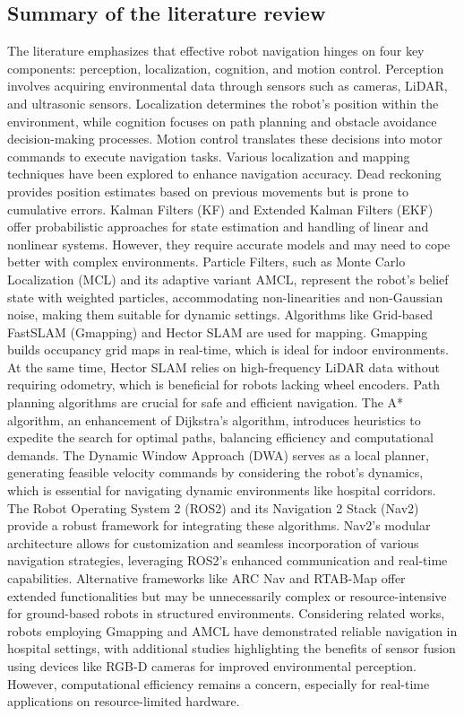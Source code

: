 \subsection{Summary of the literature review}
The literature emphasizes that effective robot navigation hinges on four key components: perception, localization, cognition, and motion control. Perception involves acquiring environmental data through sensors such as cameras, LiDAR, and ultrasonic sensors. Localization determines the robot's position within the environment, while cognition focuses on path planning and obstacle avoidance decision-making processes. Motion control translates these decisions into motor commands to execute navigation tasks.
Various localization and mapping techniques have been explored to enhance navigation accuracy. Dead reckoning provides position estimates based on previous movements but is prone to cumulative errors. Kalman Filters (KF) and Extended Kalman Filters (EKF) offer probabilistic approaches for state estimation and handling of linear and nonlinear systems. However, they require accurate models and may need to cope better with complex environments. Particle Filters, such as Monte Carlo Localization (MCL) and its adaptive variant AMCL, represent the robot's belief state with weighted particles, accommodating non-linearities and non-Gaussian noise, making them suitable for dynamic settings.
Algorithms like Grid-based FastSLAM (Gmapping) and Hector SLAM are used for mapping. Gmapping builds occupancy grid maps in real-time, which is ideal for indoor environments. At the same time, Hector SLAM relies on high-frequency LiDAR data without requiring odometry, which is beneficial for robots lacking wheel encoders.
Path planning algorithms are crucial for safe and efficient navigation. The A* algorithm, an enhancement of Dijkstra's algorithm, introduces heuristics to expedite the search for optimal paths, balancing efficiency and computational demands. The Dynamic Window Approach (DWA) serves as a local planner, generating feasible velocity commands by considering the robot's dynamics, which is essential for navigating dynamic environments like hospital corridors.
The Robot Operating System 2 (ROS2) and its Navigation 2 Stack (Nav2) provide a robust framework for integrating these algorithms. Nav2's modular architecture allows for customization and seamless incorporation of various navigation strategies, leveraging ROS2's enhanced communication and real-time capabilities. Alternative frameworks like ARC Nav and RTAB-Map offer extended functionalities but may be unnecessarily complex or resource-intensive for ground-based robots in structured environments.
Considering related works, robots employing Gmapping and AMCL have demonstrated reliable navigation in hospital settings, with additional studies highlighting the benefits of sensor fusion using devices like RGB-D cameras for improved environmental perception. However, computational efficiency remains a concern, especially for real-time applications on resource-limited hardware.

